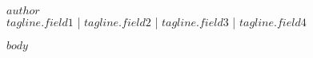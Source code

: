 \documentclass[10pt,A4]{article}
\newcommand{\metasection}[2]
{
\footnotesize{#2} \hspace*{\fill} \footnotesize{#1}\\[1pt]
}
\newcommand{\mystrut}{\rule[-.3\baselineskip]{0pt}{\baselineskip}}
\begin{document}
\pagestyle{fancy}

\vspace{-8pt}

\begin{center}
	\HUGE \textsc{$author$}\\[2pt]
	\vspace{5pt}
	\small{$tagline.field1$ | $tagline.field2$ | $tagline.field3$ | $tagline.field4$}
\end{center}

\vspace{6pt}



$body$


\null
\vspace*{\fill}
\hspace{-0.25\linewidth}\colorbox{white}{\makebox[1.5\linewidth][c]{\mystrut  \textnormal{\textcolor{sectcol}{$cvfooter.left$}  |  \textcolor{sectcol}{$cvfooter.right$}}}}
\end{document}
